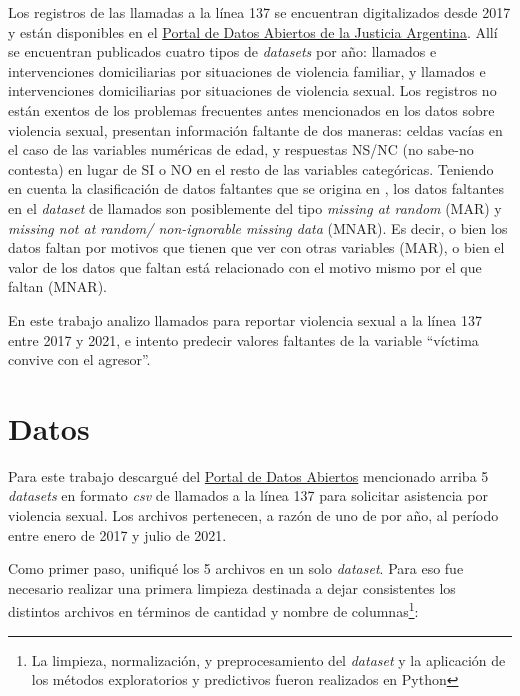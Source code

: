 \documentclass[10 pt]{article}
\begin{document}
Los registros de las llamadas a la línea 137 se encuentran digitalizados desde 2017 y están disponibles en el \href{http://datos.jus.gob.ar/}{Portal de Datos Abiertos de la Justicia Argentina}. Allí se encuentran publicados cuatro tipos de \textit{datasets} por año: llamados e intervenciones domiciliarias por situaciones de violencia familiar, y llamados e intervenciones domiciliarias por situaciones de violencia sexual.
Los registros no están exentos de los problemas frecuentes antes mencionados en los datos sobre violencia sexual, presentan información faltante de dos maneras: celdas vacías en el caso de las variables numéricas de edad, y respuestas NS/NC (no sabe-no contesta) en lugar de SI o NO en el resto de las variables categóricas. Teniendo en cuenta la clasificación de datos faltantes que se origina en \citet{rubin1976inference}, los datos faltantes en el \textit{dataset} de llamados son posiblemente del tipo \textit{missing at random} (MAR) y \textit{missing not at random/ non-ignorable missing data} (MNAR). Es decir, o bien los datos faltan por motivos que tienen que ver con otras variables (MAR), o bien el valor de los datos que faltan está relacionado con el motivo mismo por el que faltan (MNAR).

En este trabajo analizo llamados para reportar violencia sexual a la línea 137 entre 2017 y 2021, e intento predecir valores faltantes de la variable “víctima convive con el agresor”. 



\section*{Datos}\label{datos}

Para este trabajo descargué del \href{http://datos.jus.gob.ar/}{Portal de Datos Abiertos} mencionado arriba 5 \textit{datasets} en formato \textit{csv} de llamados a la línea 137 para solicitar asistencia por violencia sexual. Los archivos pertenecen, a razón de uno de por año, al período entre enero de 2017 y julio de 2021. 

Como primer paso, unifiqué los 5 archivos en un solo \textit{dataset}. Para eso fue necesario realizar una primera limpieza destinada a dejar consistentes los distintos archivos en términos de cantidad y nombre de columnas\footnote{La limpieza, normalización, y preprocesamiento del \textit{dataset} y la aplicación de los métodos exploratorios y predictivos fueron realizados en Python}:
\end{document}
